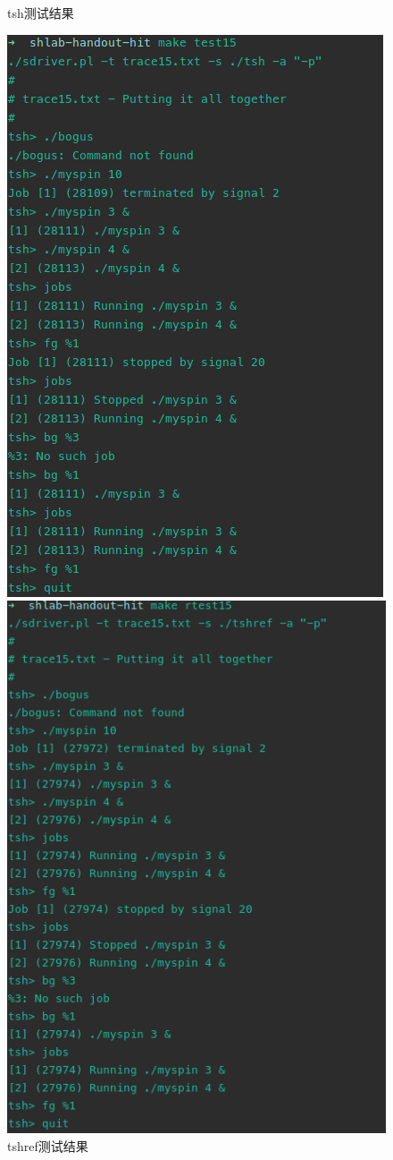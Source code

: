 \begin{figure}[H]
    \begin{minipage}[c]{0.5\linewidth}
        \centering
        \caption{tsh测试结果}
        \includegraphics[width=0.7\linewidth]{figures/test15.png}
    \end{minipage}
    \begin{minipage}[c]{0.5\linewidth}
        \centering
        \caption{tshref测试结果}
        \includegraphics[width=0.7\linewidth]{figures/rtest15.png}
    \end{minipage}
\end{figure}


